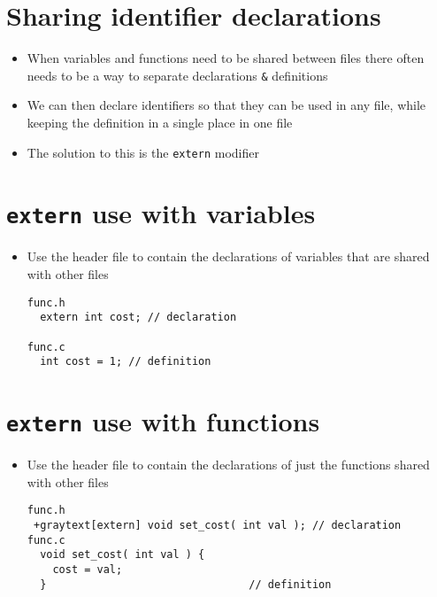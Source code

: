 \documentclass{article}
\begin{document}
\section{Sharing identifier declarations}
\begin{itemize}
\item When variables and functions need to be shared between files there often needs to be a way to separate declarations \verb!&! definitions

\item We can then declare identifiers so that they can be used in any file, while keeping the definition in a single place in one file

\item The solution to this is the \verb!extern! modifier 
\end{itemize}



\section{\texttt{extern} use with variables}
\begin{itemize}
\item Use the header file to contain the declarations of variables that are shared with other files
\begin{verbatim}
func.h
  extern int cost; // declaration

func.c
  int cost = 1; // definition
\end{verbatim}
\end{itemize}



\section{\texttt{extern} use with functions}
\begin{itemize}
\item Use the header file to contain the declarations of just the functions shared with other files
\newcommand{\graytext}[1]{\textcolor{gray}{#1}}

\begin{verbatim}
func.h
 +graytext[extern] void set_cost( int val ); // declaration
func.c
  void set_cost( int val ) {
    cost = val;
  }                                // definition
\end{verbatim}
\end{itemize}
\end{document}
